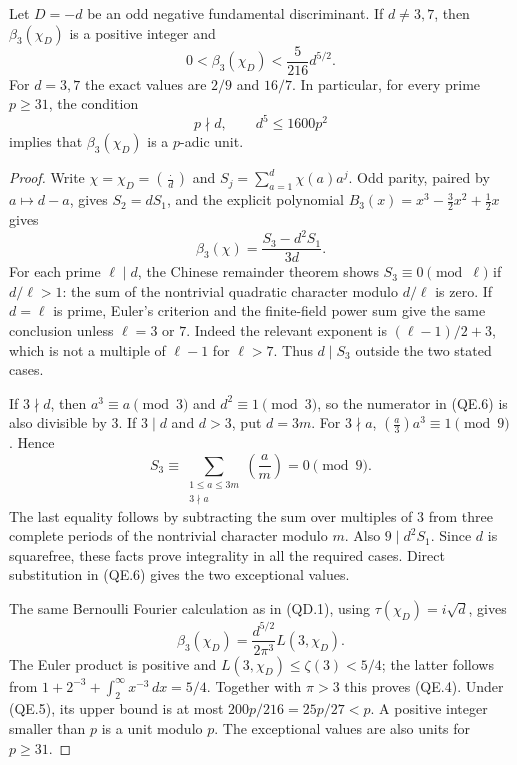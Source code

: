 \begin{proposition}
Let $D=-d$ be an odd negative fundamental discriminant.
If $d\ne3,7$, then $\beta_3(\chi_D)$ is a positive integer and
\[
 0<\beta_3(\chi_D)<\frac{5}{216}d^{5/2}.
 \tag{QE.4}
\]
For $d=3,7$ the exact values are $2/9$ and $16/7$.
In particular, for every prime $p\geq31$, the condition
\[
 p\nmid d,\qquad d^5\leq1600p^2
 \tag{QE.5}
\]
implies that $\beta_3(\chi_D)$ is a $p$-adic unit.
\end{proposition}

\begin{proof}
Write $\chi=\chi_D=(\frac{\cdot}{d})$ and
$S_j=\sum_{a=1}^d\chi(a)a^j$.  Odd parity, paired by $a\mapsto d-a$,
gives $S_2=dS_1$, and the explicit polynomial
$B_3(x)=x^3-\frac32x^2+\frac12x$ gives
\[
 \beta_3(\chi)=\frac{S_3-d^2S_1}{3d}.
 \tag{QE.6}
\]
For each prime $\ell\mid d$, the Chinese remainder theorem shows
$S_3\equiv0\pmod\ell$ if $d/\ell>1$: the sum of the nontrivial
quadratic character modulo $d/\ell$ is zero.  If $d=\ell$ is prime,
Euler's criterion and the finite-field power sum give the same
conclusion unless $\ell=3$ or $7$.  Indeed the relevant exponent
is $(\ell-1)/2+3$, which is not a multiple of $\ell-1$ for
$\ell>7$.  Thus $d\mid S_3$ outside the two stated cases.

If $3\nmid d$, then $a^3\equiv a\pmod3$ and $d^2\equiv1\pmod3$,
so the numerator in (QE.6) is also divisible by $3$.
If $3\mid d$ and $d>3$, put $d=3m$.  For $3\nmid a$,
$(\frac a3)a^3\equiv1\pmod9$.  Hence
\[
 S_3\equiv
 \sum_{\substack{1\leq a\leq3m\\3\nmid a}}
          \left(\frac a m\right)=0\pmod9.
\]
The last equality follows by subtracting the sum over multiples
of $3$ from three complete periods of the nontrivial character
modulo $m$.  Also $9\mid d^2S_1$.  Since $d$ is squarefree, these
facts prove integrality in all the required cases.
Direct substitution in (QE.6) gives the two exceptional values.

The same Bernoulli Fourier calculation as in (QD.1), using
$\tau(\chi_D)=i\sqrt d$, gives
\[
 \beta_3(\chi_D)=\frac{d^{5/2}}{2\pi^3}L(3,\chi_D).
\]
The Euler product is positive and
$L(3,\chi_D)\leq\zeta(3)<5/4$; the latter follows from
$1+2^{-3}+\int_2^\infty x^{-3}\,dx=5/4$.
Together with $\pi>3$ this proves (QE.4).
Under (QE.5), its upper bound is at most
$200p/216=25p/27<p$.  A positive integer smaller than $p$
is a unit modulo $p$.  The exceptional values are also units
for $p\geq31$.
\end{proof}


